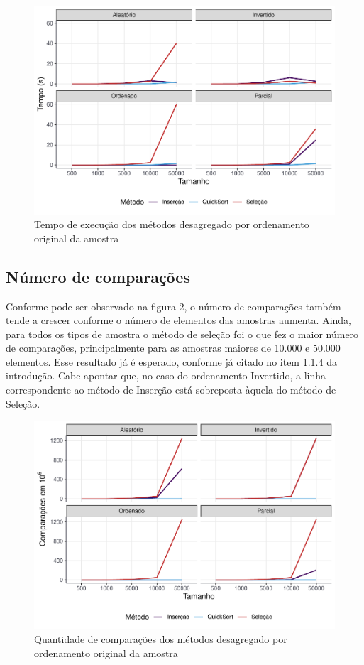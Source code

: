 \documentclass[
]{article}
\begin{document}
\begin{figure}

{\centering \includegraphics[width=0.75\linewidth]{relatorio_tp1_files/figure-latex/grafico-tempo-1} 

}

\caption{Tempo de execução dos métodos desagregado por ordenamento original da amostra}\label{fig:grafico-tempo}
\end{figure}

\hypertarget{nuxfamero-de-comparauxe7uxf5es}{%
\subsection{Número de
comparações}\label{nuxfamero-de-comparauxe7uxf5es}}

Conforme pode ser observado na figura 2, o número de comparações também
tende a crescer conforme o número de elementos das amostras aumenta.
Ainda, para todos os tipos de amostra o método de seleção foi o que fez
o maior número de comparações, principalmente para as amostras maiores
de 10.000 e 50.000 elementos. Esse resultado já é esperado, conforme já
citado no item \protect\hyperlink{sec144}{1.1.4} da introdução. Cabe
apontar que, no caso do ordenamento Invertido, a linha correspondente ao
método de Inserção está sobreposta àquela do método de Seleção.

\begin{figure}

{\centering \includegraphics[width=0.75\linewidth]{relatorio_tp1_files/figure-latex/grafico-comparacoes-1} 

}

\caption{Quantidade de comparações dos métodos desagregado por ordenamento original da amostra}\label{fig:grafico-comparacoes}
\end{figure}
\end{document}
